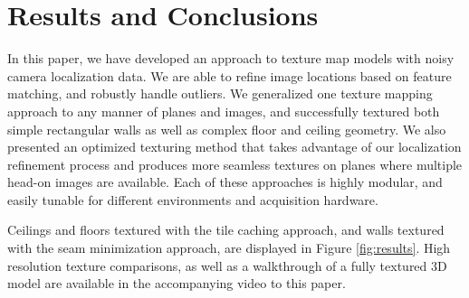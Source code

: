\documentclass[10pt,twocolumn,letterpaper]{article}
\begin{document}
\section{Results and Conclusions}
\label{sec:resultsAndConclusions}
In this paper, we have developed an approach to texture map models
with noisy camera localization data. We are able to refine image
locations based on feature matching, and robustly handle outliers.  We
generalized one texture mapping approach to any manner of planes and
images, and successfully textured both simple rectangular walls as
well as complex floor and ceiling geometry. We also presented an
optimized texturing method that takes advantage of our localization
refinement process and produces more seamless textures on planes where
multiple head-on images are available. Each of these approaches is
highly modular, and easily tunable for different environments and
acquisition hardware.

Ceilings and floors textured with the tile caching approach, and walls
textured with the seam minimization approach, are displayed in Figure
\ref{fig:results}. High resolution texture comparisons, as well as a
walkthrough of a fully textured 3D model are available in the
accompanying video to this paper.
\end{document}
